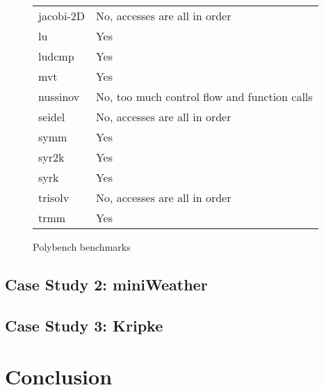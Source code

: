 \documentclass[sigconf, table]{acmart}
\begin{document}
\begin{figure*}
\begin{tabular}{ll}
jacobi-2D   & No, accesses are all in order           \\
lu          & Yes         \\
ludcmp      & Yes          \\
mvt         & Yes          \\
nussinov    & No, too much control flow and function calls          \\
seidel      & No, accesses are all in order           \\
symm        & Yes          \\
syr2k       & Yes          \\
syrk        & Yes          \\
trisolv     & No, accesses are all in order           \\
trmm        & Yes         
\end{tabular}
\caption{Polybench benchmarks}
\end{figure*}


\subsection{Case Study 2: miniWeather}

\subsection{Case Study 3: Kripke}


\section{Conclusion}
\end{document}
